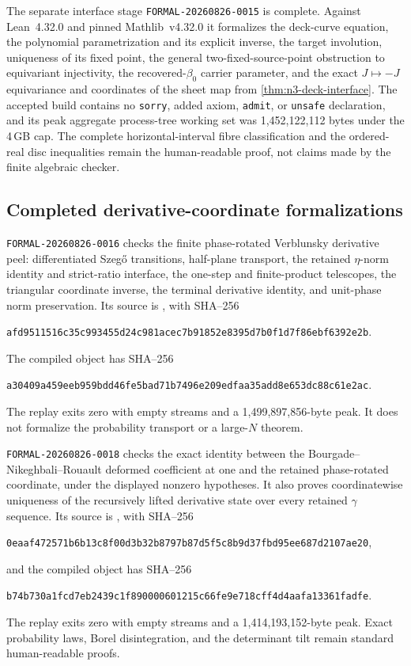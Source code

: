 The separate interface stage \texttt{FORMAL-20260826-}\allowbreak\texttt{0015} is complete.
Against Lean~4.32.0 and pinned Mathlib~v4.32.0 it formalizes the deck-curve equation,
the polynomial parametrization and its explicit inverse, the target involution, uniqueness of
its fixed point, the general two-fixed-source-point obstruction to equivariant injectivity,
the recovered-$\beta_0$ carrier parameter, and the exact $J\mapsto-J$ equivariance and
coordinates of the sheet map from \cref{thm:n3-deck-interface}.  The accepted build contains
no \texttt{sorry}, added axiom, \texttt{admit}, or \texttt{unsafe} declaration, and its peak
aggregate process-tree working set was 1,452,122,112 bytes under the 4\,GB cap.  The complete
horizontal-interval fibre classification and the ordered-real disc inequalities remain the
human-readable proof, not claims made by the finite algebraic checker.

\subsection{Completed derivative-coordinate formalizations}

\texttt{FORMAL-20260826-0016} checks the finite phase-rotated Verblunsky derivative
peel: differentiated Szeg\H{o} transitions, half-plane transport, the retained
$\eta$-norm identity and strict-ratio interface, the one-step and finite-product
telescopes, the triangular coordinate inverse, the terminal derivative identity, and
unit-phase norm preservation.  Its source is
, with SHA--256
\begin{center}\small
\texttt{afd9511516c35c993455d24c981acec7b91852e8395d7b0f1d7f86ebf6392e2b}.
\end{center}
The compiled object has SHA--256
\begin{center}\small
\texttt{a30409a459eeb959bdd46fe5bad71b7496e209edfaa35add8e653dc88c61e2ac}.
\end{center}
The replay exits zero with empty streams and a 1,499,897,856-byte peak.  It does
not formalize the probability transport or a large-$N$ theorem.

\texttt{FORMAL-20260826-0018} checks the exact identity between the
Bourgade--Nikeghbali--Rouault deformed coefficient at one and the retained
phase-rotated coordinate, under the displayed nonzero hypotheses.  It also proves
coordinatewise uniqueness of the recursively lifted derivative state over every retained
$\gamma$ sequence.  Its source is
, with SHA--256
\begin{center}\small
\texttt{0eaaf472571b6b13c8f00d3b32b8797b87d5f5c8b9d37fbd95ee687d2107ae20},
\end{center}
and the compiled object has SHA--256
\begin{center}\small
\texttt{b74b730a1fcd7eb2439c1f890000601215c66fe9e718cff4d4aafa13361fadfe}.
\end{center}
The replay exits zero with empty streams and a 1,414,193,152-byte peak.  Exact
probability laws, Borel disintegration, and the determinant tilt remain standard
human-readable proofs.


